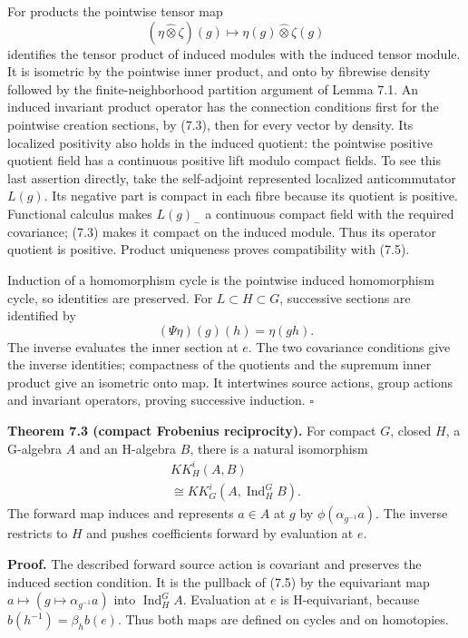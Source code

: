 \documentclass[
  11pt,
]{article}
\begin{document}
For products the pointwise tensor map \[
(\eta\widehat\otimes\zeta)(g)
 \longmapsto\eta(g)\widehat\otimes\zeta(g)
\tag{7.6}
\] identifies the tensor product of induced modules with the induced
tensor module. It is isometric by the pointwise inner product, and onto
by fibrewise density followed by the finite-neighborhood partition
argument of Lemma 7.1. An induced invariant product operator has the
connection conditions first for the pointwise creation sections, by
(7.3), then for every vector by density. Its localized positivity also
holds in the induced quotient: the pointwise positive quotient field has
a continuous positive lift modulo compact fields. To see this last
assertion directly, take the self-adjoint represented localized
anticommutator \(L(g)\). Its negative part is compact in each fibre
because its quotient is positive. Functional calculus makes \(L(g)_-\) a
continuous compact field with the required covariance; (7.3) makes it
compact on the induced module. Thus its operator quotient is positive.
Product uniqueness proves compatibility with (7.5).

Induction of a homomorphism cycle is the pointwise induced homomorphism
cycle, so identities are preserved. For \(L\subset H\subset G\),
successive sections are identified by \[
(\Psi\eta)(g)(h)=\eta(gh).
\tag{7.7}
\] The inverse evaluates the inner section at \(e\). The two covariance
conditions give the inverse identities; compactness of the quotients and
the supremum inner product give an isometric onto map. It intertwines
source actions, group actions and invariant operators, proving
successive induction. \(\square\)

\textbf{Theorem 7.3 (compact Frobenius reciprocity).} For compact \(G\),
closed \(H\), a G-algebra \(A\) and an H-algebra \(B\), there is a
natural isomorphism \[
\begin{gathered}
KK_H^i(A,B)\\
\cong KK_G^i(A,\operatorname{Ind}_H^G B).
\end{gathered}
\tag{7.8}
\] The forward map induces and represents \(a\in A\) at \(g\) by
\(\phi(\alpha_{g^{-1}}a)\). The inverse restricts to \(H\) and pushes
coefficients forward by evaluation at \(e\).

\textbf{Proof.} The described forward source action is covariant and
preserves the induced section condition. It is the pullback of (7.5) by
the equivariant map \(a\mapsto(g\mapsto\alpha_{g^{-1}}a)\) into
\(\operatorname{Ind}_H^G A\). Evaluation at \(e\) is H-equivariant,
because \(b(h^{-1})=\beta_h b(e)\). Thus both maps are defined on cycles
and on homotopies.
\end{document}
